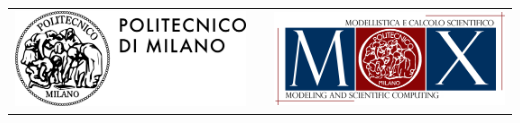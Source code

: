 \documentclass[final]{beamer}
\newlength{\onecolwid}
\begin{document}
\begin{frame}[t]
\begin{columns}[t]
\begin{column}{\onecolwid}
\begin{center}
\begin{tabular}{ccc}
    \includegraphics[width=0.4\linewidth]{images/logopoli} %
    & \hfill & %
    \includegraphics[width=0.4\linewidth]{images/logomox}
\end{tabular}
\end{center}


\end{column} %

\end{columns} %

\end{frame} %
\end{document}
